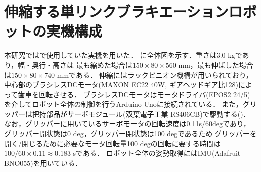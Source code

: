         
        \section{伸縮する単リンクブラキエーションロボットの実機構成}
          
          本研究では\cite{Hijiri:Robomech2024}で使用していた実機を用いた．
          に全体図を示す．重さは3.0 kgであり，幅・奥行・高さは
          最も縮めた場合は$150{\times}80{\times}560$ mm，最も伸ばした場合は$150{\times}80{\times}740$ mmである．
          伸縮にはラックピニオン機構が用いられており，中心部のブラシレスDCモータ(MAXON EC22 40W, ギアヘッドギア比128)によって歯車を回転させる．
          ブラシレスDCモータはモータドライバ(EPOS2 24/5)を介してロボット全体の制御を行うArduino Unoに接続されている．
          また，グリッパーは把持部品がサーボモジュール(双葉電子工業 RS406CB)で駆動する()．
          なお，グリッパーに用いているサーボモータの回転速度は0.11s/60degであり，
          グリッパー開状態は0 deg，グリッパー閉状態は100 degであるため
          グリッパーを開く/閉じるために必要なモータ回転量100 degの回転に要する時間は
          $100/60\times0.11\approx$0.183 sである．
          ロボット全体の姿勢取得にはIMU(Adafruit BNO055)を用いている．
          

            